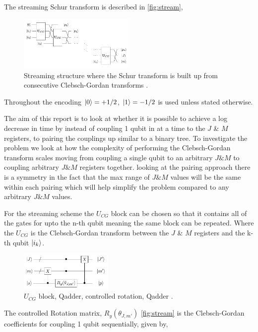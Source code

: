\documentclass[12pt]{article}
\begin{document}
The streaming Schur transform is described in \autoref{fig:stream},

\begin{figure}[h!]
\centering
\includegraphics[width=0.5\textwidth]{schurcascade.png}
\caption{Streaming structure where the Schur transform is built up from consecutive Clebsch-Gordan transforms \cite{bacon2006efficient}.}
\label{fig:stream}
\end{figure}

Throughout the encoding $\left\vert{0}\right\rangle=+1/2$, $\left\vert{1}\right\rangle=-1/2$ is used unless stated otherwise.

The aim of this report is to look at whether it is possible to achieve a log decrease in time by instead of coupling 1 qubit in at a time to the $J$ \& $M$ registers, to pairing the couplings up similar to a binary tree. To investigate the problem we look at how the complexity of performing the Clebsch-Gordan transform scales moving from coupling a single qubit to an arbitrary $J \& M$ to coupling arbitrary $J \& M$ registers together. looking at the pairing approach there is a symmetry in the fact that the max range of $J \& M$ values will be the same within each pairing which will help simplify the problem compared to any arbitrary $J \& M$ values.

For the streaming scheme the $U_{CG}$ block can be chosen so that it contains all of the gates for upto the n-th qubit meaning the same block can be repeated. Where the $U_{CG}$ is the Clebsch-Gordan transform between the $J$ \& $M$ registers and the k-th qubit $\left\vert{i_k}\right\rangle$.

\begin{figure}[h!]
\centering
\includegraphics[width=0.4\textwidth]{genaddercirc.png}
\caption{$U_{CG}$ block, Qadder, controlled rotation, Qadder \cite{bacon2006efficient}.}
\label{fig:ucg}
\end{figure}

The controlled Rotation matrix, $R_y(\theta_{J,m'})$ \autoref{fig:stream} is the Clebsch-Gordan coefficients for coupling 1 qubit sequentially, given by,
\end{document}
